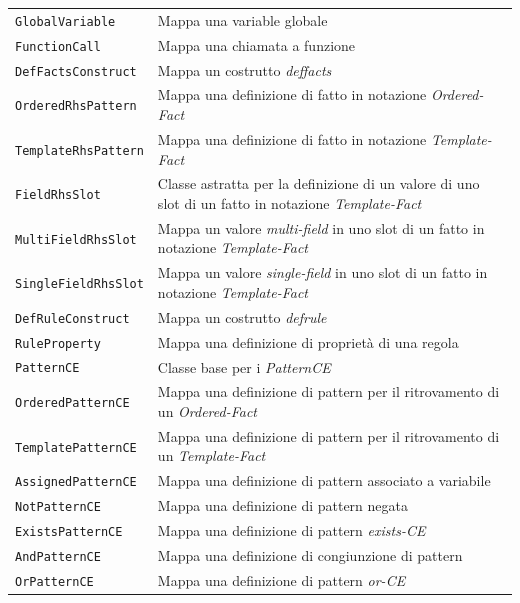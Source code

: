 \begin{longtable}{p{5.5cm}p{6.5cm}}
		\texttt{GlobalVariable} & Mappa una variable globale\\ 
	\hdashline[1pt/5pt]
		\texttt{FunctionCall} & Mappa una chiamata a funzione\\
	\hdashline[1pt/5pt]
		\texttt{DefFactsConstruct} & Mappa un costrutto \emph{deffacts}\\
	\hdashline[1pt/5pt]
		\texttt{OrderedRhsPattern} & Mappa una definizione di fatto in notazione \emph{Ordered-Fact}\\ 
	\hdashline[1pt/5pt]
		\texttt{TemplateRhsPattern} & Mappa una definizione di fatto in notazione \emph{Template-Fact}\\ 
	\hdashline[1pt/5pt]
		\texttt{FieldRhsSlot} & Classe astratta per la definizione di un valore di uno slot di un fatto in notazione \emph{Template-Fact} \\ 
	\hdashline[1pt/5pt]
		\texttt{MultiFieldRhsSlot} & Mappa un valore \emph{multi-field} in uno slot di un fatto in notazione \emph{Template-Fact} \\ 
	\hdashline[1pt/5pt]
		\texttt{SingleFieldRhsSlot} & Mappa un valore \emph{single-field} in uno slot di un fatto in notazione \emph{Template-Fact} \\ 
	\hdashline[1pt/5pt]
		\texttt{DefRuleConstruct} & Mappa un costrutto \emph{defrule}\\ 
	\hdashline[1pt/5pt]
		\texttt{RuleProperty} & Mappa una definizione di proprietà di una regola\\
	\hdashline[1pt/5pt]
		\texttt{PatternCE} & Classe base per i \emph{PatternCE}\\
	\hdashline[1pt/5pt]
		\texttt{OrderedPatternCE} & Mappa una definizione di pattern per il ritrovamento di un \emph{Ordered-Fact}\\ 
	\hdashline[1pt/5pt]
		\texttt{TemplatePatternCE} & Mappa una definizione di pattern per il ritrovamento di un \emph{Template-Fact}\\ 
	\hdashline[1pt/5pt]
		\texttt{AssignedPatternCE} & Mappa una definizione di pattern associato a variabile\\ 
	\hdashline[1pt/5pt]
		\texttt{NotPatternCE} & Mappa una definizione di pattern negata\\ 
	\hdashline[1pt/5pt]
		\texttt{ExistsPatternCE} & Mappa una definizione di pattern \emph{exists-CE}\\ 
	\hdashline[1pt/5pt]
		\texttt{AndPatternCE} & Mappa una definizione di congiunzione di pattern\\ 
	\hdashline[1pt/5pt]
		\texttt{OrPatternCE} & Mappa una definizione di pattern \emph{or-CE}\\ 

\end{longtable}
